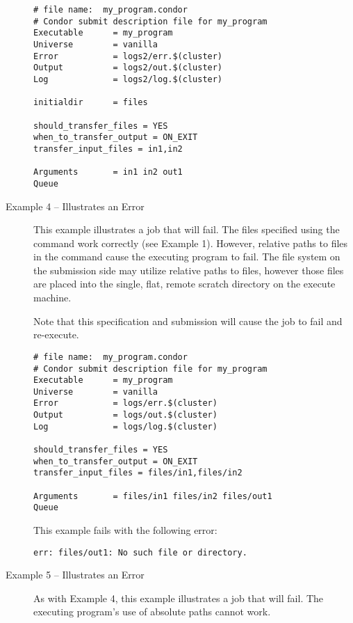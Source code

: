 \begin{description}
\footnotesize
\begin{verbatim}
# file name:  my_program.condor
# Condor submit description file for my_program
Executable      = my_program
Universe        = vanilla
Error           = logs2/err.$(cluster)
Output          = logs2/out.$(cluster)
Log             = logs2/log.$(cluster)

initialdir      = files

should_transfer_files = YES
when_to_transfer_output = ON_EXIT
transfer_input_files = in1,in2

Arguments       = in1 in2 out1
Queue
\end{verbatim}
\normalsize

\item[Example 4 -- Illustrates an Error]

This example illustrates a job that will fail.
The files specified using the
 command work
correctly (see Example 1).
However,
relative paths to files in the
 command
cause the executing program to fail.
The file system on the submission side may utilize
relative paths to files,
however those files are placed into the single,
flat, remote scratch directory on the execute machine.

Note that this specification and submission will cause the
job to fail and re-execute.

\footnotesize
\begin{verbatim}
# file name:  my_program.condor
# Condor submit description file for my_program
Executable      = my_program
Universe        = vanilla
Error           = logs/err.$(cluster)
Output          = logs/out.$(cluster)
Log             = logs/log.$(cluster)

should_transfer_files = YES
when_to_transfer_output = ON_EXIT
transfer_input_files = files/in1,files/in2

Arguments       = files/in1 files/in2 files/out1
Queue
\end{verbatim}
\normalsize

This example fails with the following error:
\footnotesize
\begin{verbatim}
err: files/out1: No such file or directory.
\end{verbatim}
\normalsize

\item[Example 5 -- Illustrates an Error]

As with Example 4,
this example illustrates a job that will fail.
The executing program's use of 
absolute paths cannot work.


\end{description}
